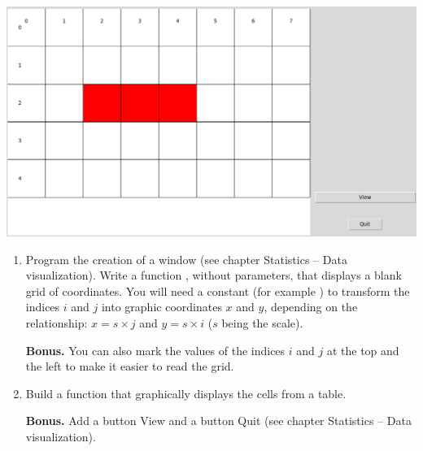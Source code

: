 \documentclass[11pt,class=report,crop=false]{standalone}
\begin{document}
\begin{activite}


\begin{center}
\includegraphics[scale=\myscale,scale=0.3]{screen-life-2-en}
\end{center} 

\begin{enumerate}
  \item Program the creation of a   window (see chapter \og{}Statistics -- Data visualization\fg{}). Write a function , without parameters, that displays a blank grid of coordinates. You will need a constant  (for example ) to transform the indices $i$ and $j$ into graphic coordinates $x$ and $y$, depending on the relationship: $x= s \times j$ and $y = s \times i$ ($s$ being the scale).
  
  \textbf{Bonus.} You can also mark the values of the indices $i$ and $j$ at the top and the left to make it easier to read the grid.
  
  \item Build a function  that graphically displays the cells from a table. 
  
  \textbf{Bonus.}  Add a button \og{}View\fg{} and a button \og{}Quit\fg{}
(see chapter \og{}Statistics -- Data visualization\fg{}).  
  
\end{enumerate}
\end{activite}



\end{document}
